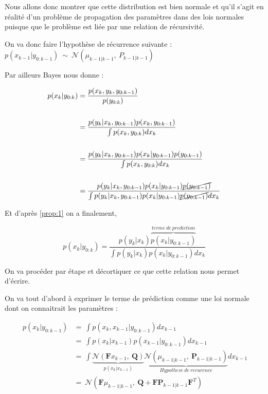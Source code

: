 Nous allons donc montrer que cette distribution est bien normale et qu'il s'agit en réalité d'un problème de propagation des paramètres dans des lois normales puisque que le problème est liée par une relation de récursivité.

On va donc faire l'hypothèse de récurrence suivante : $p( x_{k-1} |y_{0:k-1}) \ \sim \ \mathcal{N}( \mu _{k-1|k-1} ,\ P_{k-1|k-1})$

\newpage

Par ailleurs Bayes nous donne :

\begin{equation}
	\begin{aligned}
		p( x_{k} |y_{0:k}) & =\frac{p( x_{k} ,y_{k} ,y_{0:k-1})}{p( y_{0:k})}\\
		& \\
		& =\frac{p( y_{k} |x_{k} ,y_{0:k-1}) p( x_{k} ,y_{0:k-1})}{\int p( x_{k} ,y_{0:k}) dx_{k}}\\
		& \\
		& =\frac{p( y_{k} |x_{k} ,y_{0:k-1}) p( x_{k} |y_{0:k-1}) p( y_{0:k-1})}{\int p( x_{k} ,y_{0:k}) dx_{k}}\\
		& \\
		& =\frac{p( y_{k} |x_{k} ,y_{0:k-1}) p( x_{k} |y_{0:k-1})\cancel{p( y_{0:k-1})}}{\int p( y_{k} |x_{k} ,y_{0:k-1}) p( x_{k} |y_{0:k-1})\cancel{p( y_{0:k-1})} dx_{k}}
	\end{aligned}
\end{equation}

Et d'après \ref{prop:1} on a finalement,

\begin{equation}
	p( x_{k} |y_{0:k}) =\frac{p( y_{k} |x_{k})\overbrace{p( x_{k} |y_{0:k-1})}^{terme\ de\ prediction}}{\int p( y_{k} |x_{k}) p( x_{k} |y_{0:k-1}) dx_{k}}
\end{equation}


On va procéder par étape et décortiquer ce que cette relation nous permet d'écrire.

On va tout d'abord à exprimer le terme de prédiction comme une loi normale dont on connaitrait les paramètres :

\begin{equation}
	\ \begin{aligned}
		p( x_{k} |y_{0:k-1}) & =\ \int p( x_{k} ,x_{k-1} |y_{0:k-1}) dx_{k-1}\\
		& =\ \int p( x_{k} |x_{k-1}) p( x_{k-1} |y_{0:k-1}) dx_{k-1}\\
		& =\ \int \underbrace{\mathcal{N}(\mathbf{F} x_{k-1} ,\ \mathbf{Q})}_{ p( x_{k} |x_{k-1})}\underbrace{\mathcal{N}( \mu _{k-1|k-1} ,\ \mathbf{P}_{k-1|k-1})}_{Hypothese\ de\ recurence} dx_{k-1}\\
		& =\ \mathcal{N}\left(\mathbf{F} \mu _{k-1|k-1} ,\ \mathbf{Q} +\mathbf{FP}_{k-1|k-1}\mathbf{F}^{T}\right)
	\end{aligned}
\end{equation}

